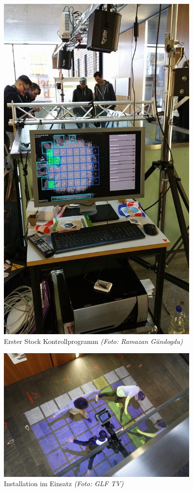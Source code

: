 \begin{figure}[htbp]
	\centering
		\includegraphics[width=0.9\textwidth]{images/TdM4.jpg}
	\caption{Erster Stock Kontrollprogramm \textit{(Foto: Ramazan Gündogdu)}}
	\label{fig:TdM4}
\end{figure}

\begin{figure}[htbp]
	\centering
		\includegraphics[width=0.9\textwidth]{images/TdM5.jpg}
	\caption{Installation im Einsatz \textit{(Foto: GLF TV)}}
	\label{fig:TdM5}
\end{figure}
\clearpage

